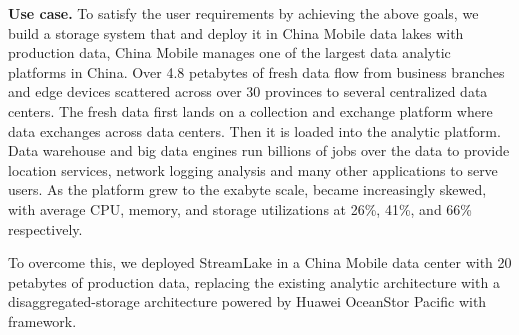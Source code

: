 \noindent \textbf{Use case.} To satisfy the user requirements by achieving the above goals, we build a storage system \sys that  and deploy it in China Mobile data lakes with production data,   China Mobile manages one of the largest data analytic platforms in China.
Over 4.8 petabytes  of fresh data flow from business branches and edge devices scattered across over 30 provinces to several centralized data centers. The fresh data first lands on a collection and exchange platform where data exchanges across data centers. Then it is loaded into the analytic platform. Data warehouse and big data engines run billions of jobs  over the data to provide location services, network logging analysis and many other applications to serve users.
As the platform grew to the exabyte scale,  became increasingly skewed, with average CPU, memory, and storage utilizations at 26\%, 41\%, and 66\% respectively.



To overcome this, we deployed StreamLake in a China Mobile data center with 20 petabytes of production data, replacing the existing analytic architecture with a disaggregated-storage architecture powered by Huawei OceanStor Pacific with  \sys framework.

